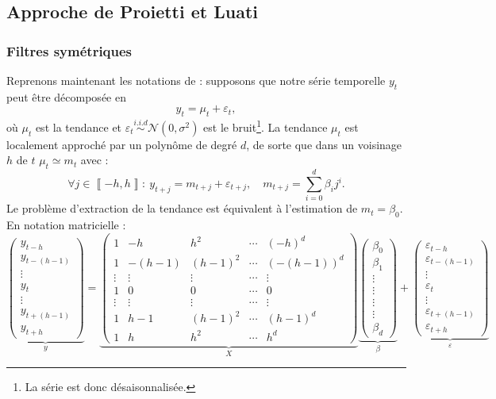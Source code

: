 \documentclass[
  11pt,
  french,
  a4paper]{article}
\newcommand\1{\mathds{1}}
\begin{document}
\hypertarget{sec-proietti}{%
\subsection{Approche de Proietti et Luati}\label{sec-proietti}}

\hypertarget{filtres-symuxe9triques}{%
\subsubsection{Filtres symétriques}\label{filtres-symuxe9triques}}

Reprenons maintenant les notations de \textcite{proietti2008} : supposons que notre série temporelle \(y_t\) peut être décomposée en
\[
y_t=\mu_t+\varepsilon_t,
\]
où \(\mu_t\) est la tendance et \(\varepsilon_{t}\overset{i.i.d}{\sim}\mathcal{N}(0,\sigma^{2})\) est le bruit\footnote{La série est donc désaisonnalisée.}.
La tendance \(\mu_t\) est localement approché par un polynôme de degré \(d\), de sorte que dans un voisinage \(h\) de \(t\) \(\mu_t\simeq m_{t}\) avec :
\[
\forall j\in\left\llbracket -h,h\right\rrbracket :\:
y_{t+j}=m_{t+j}+\varepsilon_{t+j},\quad m_{t+j}=\sum_{i=0}^{d}\beta_{i}j^{i}.
\]
Le problème d'extraction de la tendance est équivalent à l'estimation de \(m_t=\beta_0\).
En notation matricielle :
\[
\underbrace{\begin{pmatrix}y_{t-h}\\
y_{t-(h-1)}\\
\vdots\\
y_{t}\\
\vdots\\
y_{t+(h-1)}\\
y_{t+h}
\end{pmatrix}}_{y}=\underbrace{\begin{pmatrix}1 & -h & h^{2} & \cdots & (-h)^{d}\\
1 & -(h-1) & (h-1)^{2} & \cdots & (-(h-1))^{d}\\
\vdots & \vdots & \vdots & \cdots & \vdots\\
1 & 0 & 0 & \cdots & 0\\
\vdots & \vdots & \vdots & \cdots & \vdots\\
1 & h-1 & (h-1)^{2} & \cdots & (h-1)^{d}\\
1 & h & h^{2} & \cdots & h^{d}
\end{pmatrix}}_{X}\underbrace{\begin{pmatrix}\beta_{0}\\
\beta_{1}\\
\vdots\\
\vdots\\
\vdots\\
\vdots\\
\beta_{d}
\end{pmatrix}}_{\beta}+\underbrace{\begin{pmatrix}\varepsilon_{t-h}\\
\varepsilon_{t-(h-1)}\\
\vdots\\
\varepsilon_{t}\\
\vdots\\
\varepsilon_{t+(h-1)}\\
\varepsilon_{t+h}
\end{pmatrix}}_{\varepsilon}
\]
\end{document}

